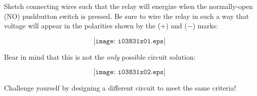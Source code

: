 

Sketch connecting wires such that the relay will energize when the normally-open (NO) pushbutton switch is pressed.  Be sure to wire the relay in such a way that voltage will appear in the polarities shown by the (+) and ($-$) marks:

$$\texttt{[image: i03831x01.eps]}$$







Bear in mind that this is not the {\it only} possible circuit solution:

$$\texttt{[image: i03831x02.eps]}$$

Challenge yourself by designing a different circuit to meet the same criteria! 










